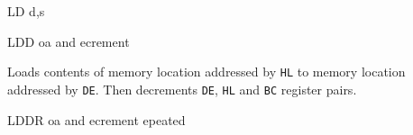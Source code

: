 \begin{basedescript}{
    \desclabelstyle{\multilinelabel}
    \desclabelwidth{3cm}}
\begin{DetailItem}{LD d,s}
        \begin{DetailTiming}
        \end{DetailTiming}

    \end{DetailItem}

    \pagebreak
    \begin{DetailItem}{LDD}
        {oa and ecrement}		
        {\SymLDD}

        Loads contents of memory location addressed by {\tt HL} to memory location addressed by {\tt DE}. Then decrements {\tt DE}, {\tt HL} and {\tt BC} register pairs.

        \begin{DetailEffects}
            \FlagsLDD
        \end{DetailEffects}
				
        \begin{DetailTiming}
        \end{DetailTiming}

    \end{DetailItem}

    \begin{DetailItem}{LDDR}
        {oa and ecrement epeated}		
        {\SymLDDR}


\end{DetailItem}
\end{basedescript}
